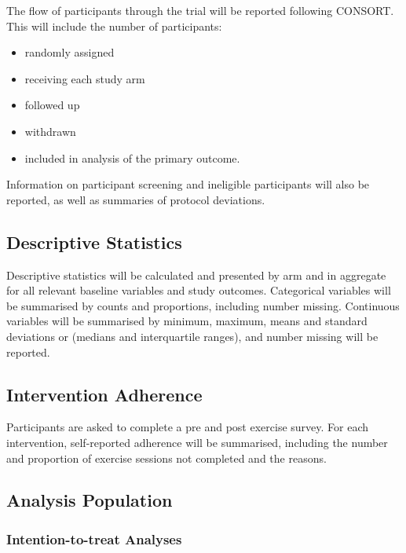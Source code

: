 \documentclass[
]{article}
\providecommand{\tightlist}{%
  \setlength{\itemsep}{0pt}\setlength{\parskip}{0pt}}
\begin{document}
The flow of participants through the trial will be reported following CONSORT.
This will include the number of participants:

\begin{itemize}
  \tightlist
  \item randomly assigned  
  \item receiving each study arm
  \item followed up
  \item withdrawn
  \item included in analysis of the primary outcome.
\end{itemize}

Information on participant screening and ineligible participants will also be reported, as well as summaries of protocol deviations.


\hypertarget{descriptive-statistics}{%
  \subsection{Descriptive Statistics}\label{descriptive-statistics}}

Descriptive statistics will be calculated and presented by arm and in aggregate for all relevant baseline variables and study outcomes.
Categorical variables will be summarised by counts and proportions, including number missing.
Continuous variables will be summarised by minimum, maximum, means and standard deviations or (medians and interquartile ranges), and number missing will be reported.

\hypertarget{adherence}{%
  \subsection{Intervention Adherence}\label{adherence}}

Participants are asked to complete a pre and post exercise survey.
For each intervention, self-reported adherence will be summarised, including the number and proportion of exercise sessions not completed and the reasons. 

\hypertarget{analysis-population}{%
  \subsection{Analysis Population}\label{analysis-population}}

\subsubsection{Intention-to-treat Analyses}
\end{document}
